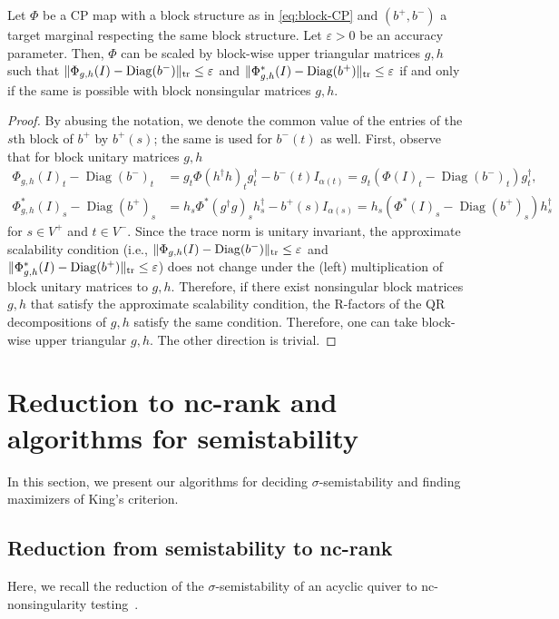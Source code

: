 \documentclass[a4paper,11pt]{article}
\numberwithin{equation}{section}
\newcommand{\eps}{\varepsilon}
\DeclareMathOperator{\tr}{tr}
\DeclareMathOperator{\Diag}{Diag}
\DeclarePairedDelimiter{\norm}{\lVert}{\rVert}
\begin{document}
\begin{lemma}\label{lem:block-marginal}
    Let  $\Phi$ be a CP map with a block structure as in \eqref{eq:block-CP} and $(b^+, b^-)$ a target marginal respecting the same block structure.
    Let $\eps > 0$ be an accuracy parameter.
    Then, $\Phi$ can be scaled by block-wise upper triangular matrices $g, h$ such that $\norm{\Phi_{g,h}(I) - \Diag(b^-)}_{\tr} \leq \eps$ and $\norm{\Phi_{g,h}^*(I) - \Diag(b^+)}_{\tr} \leq \eps$ if and only if the same is possible with block nonsingular matrices $g, h$.
\end{lemma}
\begin{proof}
    By abusing the notation, we denote the common value of the entries of the $s$th block of $b^+$ by $b^+(s)$; the same is used for $b^-(t)$ as well.
    First, observe that for block unitary matrices $g, h$ 
    \begin{align}
        \Phi_{g,h}(I)_t - \Diag(b^-)_t &= g_t \Phi(h^\dagger h)_t g_t^\dagger - b^-(t)I_{\alpha(t)}
        = g_t(\Phi(I)_t - \Diag(b^-)_t)g_t^\dagger, \\ 
        \Phi^*_{g,h}(I)_s - \Diag(b^+)_s &= h_s \Phi^*(g^\dagger g)_s h_s^\dagger - b^+(s)I_{\alpha(s)} = h_s(\Phi^*(I)_s - \Diag(b^+)_s)h_s^\dagger
    \end{align}
    for $s \in V^+$ and $t \in V^-$.
    Since the trace norm is unitary invariant, the approximate scalability condition (i.e., $\norm{\Phi_{g,h}(I) - \Diag(b^-)}_{\tr} \leq \eps$ and $\norm{\Phi_{g,h}^*(I) - \Diag(b^+)}_{\tr} \leq \eps$) does not change under the (left) multiplication of block unitary matrices to $g, h$.
    Therefore, if there exist nonsingular block matrices $g, h$ that satisfy the approximate scalability condition, the R-factors of the QR decompositions of $g, h$ satisfy the same condition.
    Therefore, one can take block-wise upper triangular $g, h$.
    The other direction is trivial.
\end{proof}

\section{Reduction to nc-rank and algorithms for semistability}\label{sec:ss}
In this section, we present our algorithms for deciding $\sigma$-semistability and finding maximizers of King's criterion.

\subsection{Reduction from semistability to nc-rank}
Here, we recall the reduction of the $\sigma$-semistability of an acyclic quiver to nc-nonsingularity testing~\citep{Derksen2017}.
\end{document}
